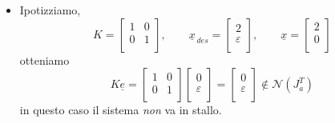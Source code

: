 \begin{itemize}
	\item Ipotizziamo, 
	\begin{equation*}
		K =
		\begin{bmatrix}
			1 & 0 \\
			0 & 1 \\
		\end{bmatrix}
		, \qquad \underline{x}_{\,des} =  
		\begin{bmatrix}
			2 \\
			\varepsilon \\
		\end{bmatrix}
		, \qquad \underline{x} = 
		\begin{bmatrix}
			2 \\
			0 \\
		\end{bmatrix}
	\end{equation*}
	otteniamo 
	\begin{equation*}
		K \underline{e} = 
		\begin{bmatrix}
			1 & 0 \\
			0 & 1 \\
		\end{bmatrix}
		\begin{bmatrix}
			0 \\
			\varepsilon \\
		\end{bmatrix}
		=
		\begin{bmatrix}
			0 \\
			\varepsilon \\
		\end{bmatrix}
		\not\in\mathcal{N}(J_a^T)
	\end{equation*}
	in questo caso il sistema \emph{non} va in stallo.
	

\end{itemize}
